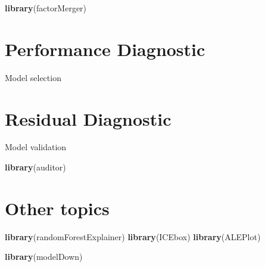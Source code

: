 \documentclass[]{book}
\newenvironment{Shaded}{\begin{snugshade}}{\end{snugshade}}
\newcommand{\KeywordTok}[1]{\textcolor[rgb]{0.13,0.29,0.53}{\textbf{#1}}}
\newcommand{\NormalTok}[1]{#1}
\theoremstyle{definition}
\theoremstyle{definition}
\theoremstyle{definition}
\theoremstyle{remark}
\begin{document}
\citep{R-factorMerger}

\begin{Shaded}
\begin{Highlighting}[]
\KeywordTok{library}\NormalTok{(factorMerger)}
\end{Highlighting}
\end{Shaded}

\hypertarget{performance-diagnostic}{%
\chapter{Performance Diagnostic}\label{performance-diagnostic}}

Model selection

\hypertarget{residual-diagnostic}{%
\chapter{Residual Diagnostic}\label{residual-diagnostic}}

Model validation

\citep{R-auditor}

\begin{Shaded}
\begin{Highlighting}[]
\KeywordTok{library}\NormalTok{(auditor)}
\end{Highlighting}
\end{Shaded}

\hypertarget{other-topics}{%
\chapter{Other topics}\label{other-topics}}

\citep{R-randomForestExplainer} \citep{R-ICEbox} \citep{R-ALEPlot}

\begin{Shaded}
\begin{Highlighting}[]
\KeywordTok{library}\NormalTok{(randomForestExplainer)}
\KeywordTok{library}\NormalTok{(ICEbox)}
\KeywordTok{library}\NormalTok{(ALEPlot)}
\end{Highlighting}
\end{Shaded}

\citep{R-modelDown}

\begin{Shaded}
\begin{Highlighting}[]
\KeywordTok{library}\NormalTok{(modelDown)}
\end{Highlighting}
\end{Shaded}
\end{document}
